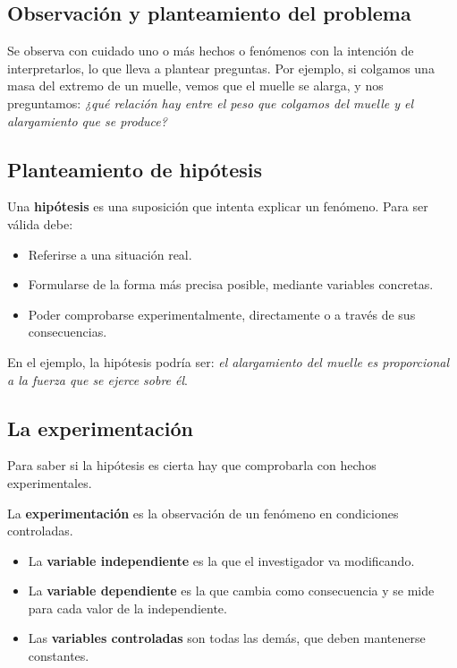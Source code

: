 \subsection{Observación y planteamiento del problema}

Se observa con cuidado uno o más hechos o fenómenos con la intención de interpretarlos, lo que lleva a plantear preguntas. Por ejemplo, si colgamos una masa del extremo de un muelle, vemos que el muelle se alarga, y nos preguntamos: \emph{¿qué relación hay entre el peso que colgamos del muelle y el alargamiento que se produce?}

\subsection{Planteamiento de hipótesis}

\begin{definition}
    Una \textbf{hipótesis} es una suposición que intenta explicar un fenómeno. Para ser válida debe:
    \begin{itemize}
        \item Referirse a una situación real.
        \item Formularse de la forma más precisa posible, mediante variables concretas.
        \item Poder comprobarse experimentalmente, directamente o a través de sus consecuencias.
    \end{itemize}
\end{definition}

En el ejemplo, la hipótesis podría ser: \emph{el alargamiento del muelle es proporcional a la fuerza que se ejerce sobre él}.

\subsection{La experimentación}

Para saber si la hipótesis es cierta hay que comprobarla con hechos experimentales.

\begin{definition}
    La \textbf{experimentación} es la observación de un fenómeno en condiciones controladas.
    \begin{itemize}
        \item La \textbf{variable independiente} es la que el investigador va modificando.
        \item La \textbf{variable dependiente} es la que cambia como consecuencia y se mide para cada valor de la independiente.
        \item Las \textbf{variables controladas} son todas las demás, que deben mantenerse constantes.
    \end{itemize}
\end{definition}

